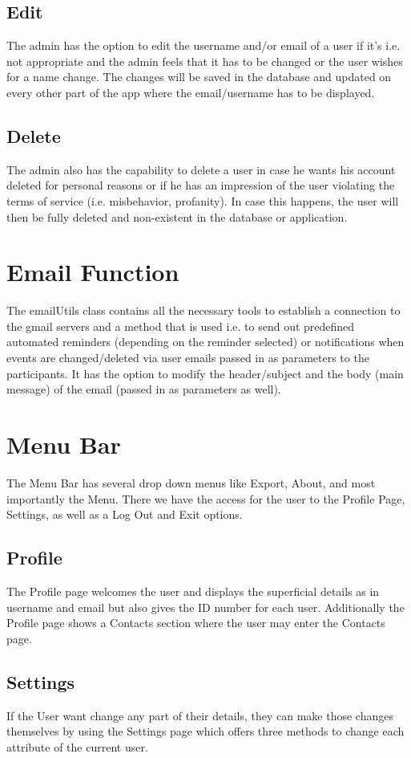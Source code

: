 \subsection{Edit}
The admin has the option to edit the username and/or email of a user if it's i.e. not appropriate and the admin feels that it has to be changed or the user wishes for a name change. The changes will be saved in the database and updated on every other part of the app where the email/username has to be displayed.

\subsection{Delete}
The admin also has the capability to delete a user in case he wants his account deleted for personal reasons or if he has an impression of the user violating the terms of service (i.e. misbehavior, profanity). In case this happens, the user will then be fully deleted and non-existent in the database or application.

\section{Email Function}
The emailUtils class contains all the necessary tools to establish a connection to the gmail servers and a method that is used i.e. to send out predefined automated reminders (depending on the reminder selected) or notifications when events are changed/deleted via user emails passed in as parameters to the participants. It has the option to modify the header/subject and the body (main message) of the email (passed in as parameters as well).

\section{Menu Bar}
The Menu Bar has several drop down menus like Export, About, and most importantly the Menu. There we have the access for the user to the Profile Page, Settings, as well as a Log Out and Exit options.
\subsection{Profile}
The Profile page welcomes the user and displays the superficial details as in username and email but also gives the ID number for each user. Additionally the Profile page shows a Contacts section where the user may enter the Contacts page.
\subsection{Settings}
If the User want change any part of their details, they can make those changes themselves by using the Settings page which offers three methods to change each attribute of the current user.
